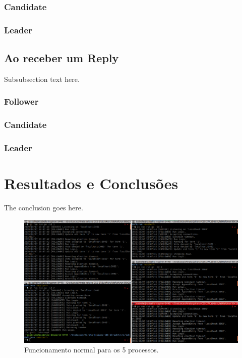 \documentclass[journal,onecolumn]{IEEEtran}
\begin{document}
\subsubsection{Candidate}
\subsubsection{Leader}

\subsection{Ao receber um Reply}
Subsubsection text here.

\subsubsection{Follower}
\subsubsection{Candidate}
\subsubsection{Leader}

\section{Resultados e Conclusões}
The conclusion goes here.

\begin{figure}[H]
\centering
\centerline{\includegraphics[scale=0.4]{imagens/funcionamento_normal.png}}
\caption{Funcionamento normal para os 5 processos.}
\label{funcionamento_normal}
\end{figure}
\end{document}
